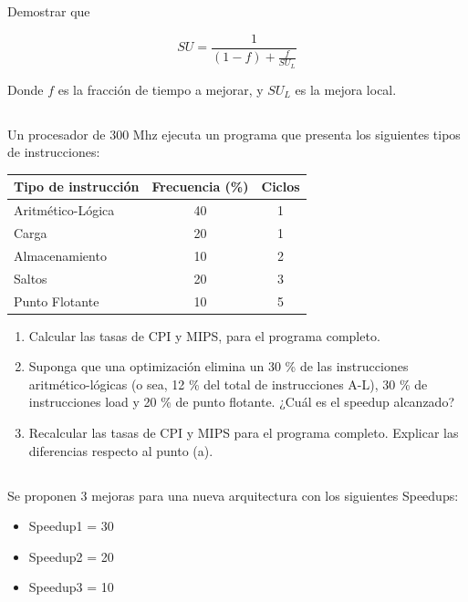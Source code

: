 \subsection{}
Demostrar que 

						 $$ SU = \frac {1} {(1-f) + \frac {f}{SU_L}} $$


Donde $f$ es la fracción de tiempo a mejorar, y $SU_L$ es la mejora local.

\subsection{}

Un procesador de 300 Mhz ejecuta un programa que presenta los siguientes tipos de instrucciones:

\begin{table}[h!]
\begin{tabular}{|l|c|c|}
\hline
 Tipo de instrucción & Frecuencia (\%)  &  Ciclos  \\ \hline
 Aritmético-Lógica & 40  &  1  \\ \hline
 Carga & 20 & 1 \\ \hline
 Almacenamiento & 10  & 2  \\ \hline
 Saltos & 20  & 3 \\ \hline
 Punto Flotante & 10 & 5  \\ \hline
\end{tabular}
\end{table}

\begin{enumerate}[label=\alph*)]
 \item Calcular las tasas de CPI y MIPS, para el programa completo.
 \item Suponga que una optimización elimina un 30 \% de las instrucciones aritmético-lógicas (o sea, 12 \% del total de instrucciones A-L), 30 \% de instrucciones load y 20 \% de punto flotante. ¿Cuál es el speedup alcanzado?
 \item Recalcular las tasas de CPI y MIPS para el programa completo. Explicar las diferencias respecto al punto (a).
\end{enumerate}

\subsection{}
Se proponen 3 mejoras para una nueva arquitectura con los siguientes Speedups:
\begin{itemize}
\item Speedup1 = 30
\item Speedup2 = 20
\item Speedup3 = 10
\end{itemize}

